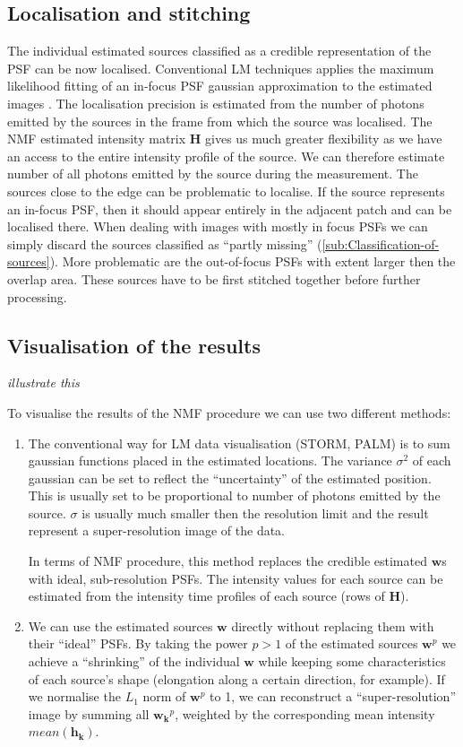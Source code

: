 \subsection{Localisation and stitching\label{sub:Localisation-and-stitching}}
The individual estimated sources classified as a credible representation of the PSF can be now localised. Conventional LM techniques applies the maximum likelihood fitting of an in-focus PSF gaussian approximation to the estimated images \cite{Hess2006}. The localisation precision is estimated from the number of photons emitted by the sources in the frame from which the source was localised. The NMF estimated intensity matrix $\bm{H}$ gives us much greater flexibility as we have an access to the entire intensity profile of the source. We can therefore estimate number of all photons emitted by the source during the measurement. The sources close to the edge can be problematic to localise. If the source represents an in-focus PSF, then it should appear entirely in the adjacent patch and can be localised there. When dealing with images with mostly in focus PSFs we can simply discard the sources classified as ``partly missing'' (\autoref{sub:Classification-of-sources}). More problematic are the out-of-focus PSFs with extent larger then the overlap area. These sources have to be first stitched together before further processing.


\subsection{Visualisation of the results\label{sub:visualisation}}
\fix \emph{illustrate this}

To visualise the results of the NMF procedure we can use two different methods: 
\begin{enumerate}
	\item
	The conventional way for LM data visualisation (STORM, PALM) is to sum gaussian functions placed in the estimated locations. The variance $\sigma^{2}$ of each gaussian can be set to reflect the ``uncertainty'' of the estimated position. This is usually set to be proportional to number of photons emitted by the source. $\sigma$ is usually much smaller then the resolution limit and the result represent a super-resolution image of the data. 
	
	In terms of NMF procedure, this method replaces the credible estimated $\bm{w}$s with ideal, sub-resolution PSFs. The intensity values for each source can be estimated from the intensity time profiles of each source (rows of $\bm{H}$). 	
	\item
	We can use the estimated sources $\bm{w}$ directly without replacing them with their ``ideal'' PSFs. By taking the power $p>1$ of the estimated sources $\bm{w}^{p}$ we achieve a ``shrinking'' of the individual $\bm{w}$ while keeping some characteristics of each source's shape (elongation along a certain direction, for example). If we normalise the $L_{1}$ norm of $\bm{w}^{p}$ to 1, we can reconstruct a ``super-resolution'' image by summing all $\bm{w_{k}}^{p}$, weighted by the corresponding mean intensity $\unit{mean}(\bm{h_{k}})$.
\end{enumerate}

